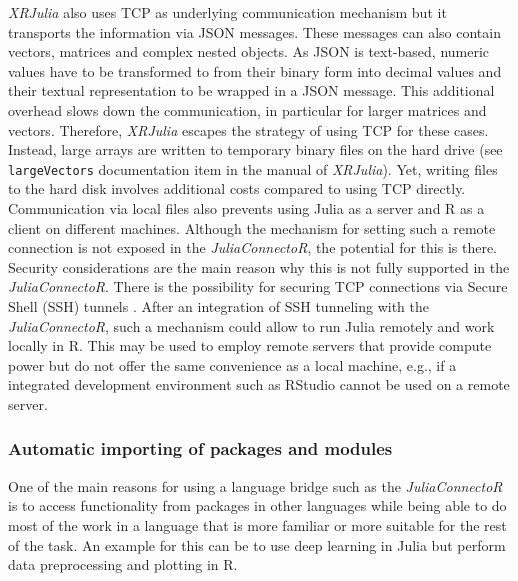 \documentclass[12pt]{article}
\newcommand{\inlinecode}[1]{\texttt{#1}}
\newcommand{\apkg}[1]{\emph{#1}}
\begin{document}
\apkg{XRJulia} also uses TCP as underlying communication mechanism but it transports the information via JSON messages.
These messages can also contain vectors, matrices and complex nested objects.
As JSON is text-based, numeric values have to be transformed to from their binary form into decimal values and their textual representation to be wrapped in a JSON message.
This additional overhead slows down the communication, in particular for larger matrices and vectors.
Therefore, \apkg{XRJulia} escapes the strategy of using TCP for these cases.
Instead, large arrays are written to temporary binary files on the hard drive (see \inlinecode{largeVectors} documentation item in the manual of \apkg{XRJulia}).
Yet, writing files to the hard disk involves additional costs compared to using TCP directly.
Communication via local files also prevents using Julia as a server and R as a client on different machines.
Although the mechanism for setting such a remote connection is not exposed in the \apkg{JuliaConnectoR}, the potential for this is there.
Security considerations are the main reason why this is not fully supported in the \apkg{JuliaConnectoR}.
There is the possibility for securing TCP connections via Secure Shell (SSH) tunnels \citep{ylonen_ssh}.
After an integration of SSH tunneling with the \apkg{JuliaConnectoR}, such a mechanism could allow to run Julia remotely and work locally in R.
This may be used to employ remote servers that provide compute power but do not offer the same convenience as a local machine, e.g., if a integrated development environment such as RStudio \citep{rstudio} cannot be used on a remote server.


\subsubsection{Automatic importing of packages and modules}\label{juliaconnectoRAutoimport}

One of the main reasons for using a language bridge such as the \apkg{JuliaConnectoR} is to access functionality from packages in other languages while being able to do most of the work in a language that is more familiar or more suitable for the rest of the task.
An example for this can be to use deep learning in Julia but perform data preprocessing and plotting in R.
\end{document}
